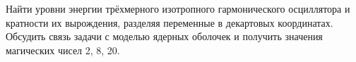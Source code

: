 \documentclass[a4paper]{article}
\begin{document}
\begin{sol}
\end{sol}
\begin{problem}
Найти уровни энергии трёхмерного изотропного гармонического
осциллятора и кратности их вырождения, разделяя переменные
в декартовых координатах. Обсудить связь задачи с моделью
ядерных оболочек и получить значения магических чисел 2, 8, 20.
\end{problem}
\end{document}
